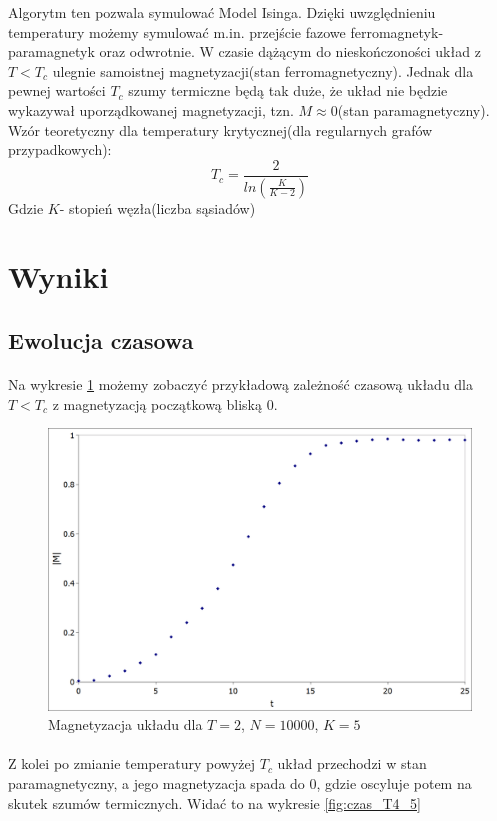 \documentclass[12pt,a4paper]{article}
\begin{document}
Algorytm ten pozwala symulować Model Isinga. Dzięki uwzględnieniu temperatury możemy symulować m.in. przejście fazowe ferromagnetyk- paramagnetyk oraz odwrotnie.
W czasie dążącym do nieskończoności układ z $T<T_{c}$ ulegnie samoistnej magnetyzacji(stan ferromagnetyczny). Jednak dla pewnej wartości $T_c$ szumy termiczne będą tak duże, że układ nie będzie wykazywał uporządkowanej magnetyzacji, tzn. $M\approx0$(stan paramagnetyczny). Wzór teoretyczny dla temperatury krytycznej(dla regularnych grafów przypadkowych):
$$ T_{c}=\frac{2}{ln(\frac{K}{K-2})} $$
Gdzie $K$- stopień węzła(liczba sąsiadów)

\section{Wyniki}
\subsection{Ewolucja czasowa}
\paragraph{}
Na wykresie \ref{fig:czas_T2} możemy zobaczyć przykładową zależność czasową układu dla $T<T_{c}$ z magnetyzacją początkową bliską 0.
\begin{figure}[H]
\includegraphics[width=\textwidth]{czas_T2.png}
\caption{Magnetyzacja układu dla $T=2$, $N=10000$, $K=5$}
\label{fig:czas_T2}
\end{figure}
\paragraph{}
Z kolei po zmianie temperatury powyżej $T_{c}$ układ przechodzi w stan paramagnetyczny, a jego magnetyzacja spada do 0, gdzie oscyluje potem na skutek szumów termicznych. Widać to na wykresie \ref{fig:czas_T4_5}
\end{document}
